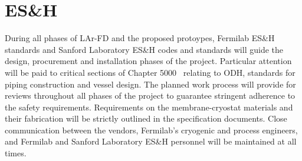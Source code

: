 \section{ES\&H}
\label{sec:cryo-esh}

During all phases of LAr-FD and the proposed protoypes, Fermilab ES\&H standards and
Sanford Laboratory ES\&H codes and standards will guide the design, procurement and
installation phases of the project. Particular attention will be paid to critical sections of
Chapter 5000~\cite{feshm} relating to ODH, standards for piping construction and vessel design. The
planned work process will provide for reviews throughout all phases of the project to guarantee
stringent adherence to the safety requirements. Requirements on the membrane-cryostat
materials and their fabrication will be strictly outlined in the specification documents. Close
communication between the vendors, Fermilab's cryogenic and process engineers, and Fermilab and Sanford Laboratory ES\&H personnel will be maintained at all times.
